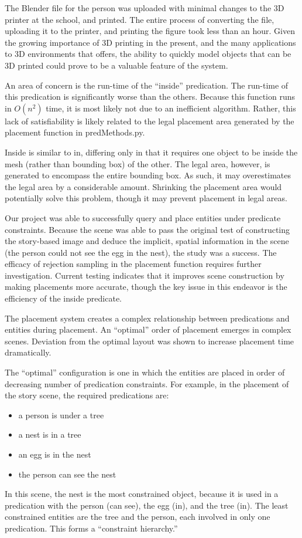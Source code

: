 The Blender file for the person was uploaded with minimal changes to the 3D printer at the school, and printed. The entire process of converting the file, uploading it to the printer, and printing the figure took less than an hour. Given the growing importance of 3D printing in the present, and the many applications to 3D environments that \TDS offers, the ability to quickly model objects that can be 3D printed could prove to be a valuable feature of the system.

An area of concern is the run-time of the ``inside'' predication.
The run-time of this predication is significantly worse than the others. Because this function runs in $O(n^2)$ time, it is most likely not due to an inefficient algorithm. Rather, this lack of satisfiability is likely related to the legal placement area generated by the placement function in predMethods.py.

Inside is similar to in, differing only in that it requires one object to be inside the mesh (rather than bounding box) of the other. The legal area, however, is generated to encompass the entire bounding box. As such, it may overestimates the legal area by a considerable amount. Shrinking the placement area would potentially solve this problem, though it may prevent placement in legal areas. 

Our project was able to successfully query and place entities under predicate constraints. Because the scene was able to pass the original test of constructing the story-based image and deduce the implicit, spatial information in the scene (the person could not see the egg in the nest), the study was a success. The efficacy of rejection sampling in the placement function requires further investigation. Current testing indicates that it improves scene construction by making placements more accurate, though the key issue in this endeavor is the efficiency of the inside predicate.

The placement system creates a complex relationship between predications and entities during placement. An ``optimal'' order of placement emerges in complex scenes. Deviation from the optimal layout was shown to increase placement time dramatically.

The ``optimal'' configuration is one in which the entities are placed in order of decreasing number of predication constraints. For example, in the placement of the story scene, the required predications are:
\begin{center}
	\begin{itemize}
		\item a person is under a tree
		\item a nest is in a tree
		\item an egg is in the nest
		\item the person can see the nest
	\end{itemize}
\end{center} 
In this scene, the nest is the most constrained object, because it is used in a predication with the person (can see), the egg (in), and the tree (in). The least constrained entities are the tree and the person, each involved in only one predication. This forms a ``constraint hierarchy.'' 

